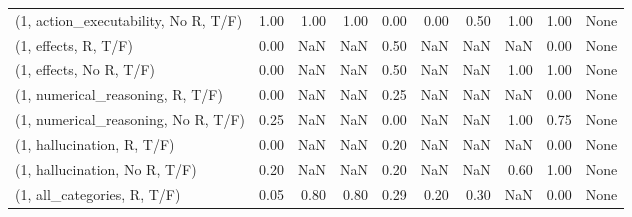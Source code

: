 \begin{table*}[h!]
\begin{adjustbox}{width=2\columnwidth,center}
\begin{tabular}{lrrr|rrr|rrr}
(1, action\_executability, No R, T/F) &                      1.00 &                  1.00 &                      1.00 &                          0.00 &                      0.00 &                          0.50 &                                   1.00 &                               1.00 &                                  None \\
(1, effects, R, T/F)                 &                      0.00 &                   NaN &                       NaN &                          0.50 &                       NaN &                           NaN &                                    NaN &                               0.00 &                                  None \\
(1, effects, No R, T/F)              &                      0.00 &                   NaN &                       NaN &                          0.50 &                       NaN &                           NaN &                                   1.00 &                               1.00 &                                  None \\
(1, numerical\_reasoning, R, T/F)     &                      0.00 &                   NaN &                       NaN &                          0.25 &                       NaN &                           NaN &                                    NaN &                               0.00 &                                  None \\
(1, numerical\_reasoning, No R, T/F)  &                      0.25 &                   NaN &                       NaN &                          0.00 &                       NaN &                           NaN &                                   1.00 &                               0.75 &                                  None \\
(1, hallucination, R, T/F)           &                      0.00 &                   NaN &                       NaN &                          0.20 &                       NaN &                           NaN &                                    NaN &                               0.00 &                                  None \\
(1, hallucination, No R, T/F)        &                      0.20 &                   NaN &                       NaN &                          0.20 &                       NaN &                           NaN &                                   0.60 &                               1.00 &                                  None \\
(1, all\_categories, R, T/F)          &                      0.05 &                  0.80 &                      0.80 &                          0.29 &                      0.20 &                          0.30 &                                    NaN &                               0.00 &                                  None \\

\end{tabular}
\end{adjustbox}
\end{table*}
